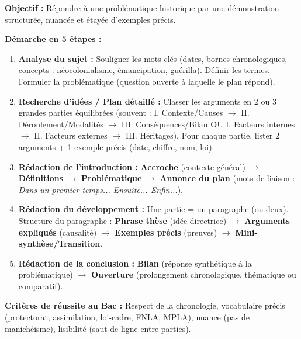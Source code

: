 \documentclass[11pt]{article}
\newcommand{\cle}[1]{{\popxbold\color{popdark}#1}}
\begin{document}
\begin{methode}
\textbf{Objectif :} Répondre à une problématique historique par une démonstration structurée, nuancée et étayée d'exemples précis.
\par \textbf{Démarche en 5 étapes :}
\begin{enumerate}
    \item \textbf{Analyse du sujet :} Souligner les mots-clés (dates, bornes chronologiques, concepts : \cle{néocolonialisme}, \cle{émancipation}, \cle{guérilla}). Définir les termes. Formuler la \cle{problématique} (question ouverte à laquelle le plan répond).
    \item \textbf{Recherche d'idées / Plan détaillé :} Classer les arguments en 2 ou 3 grandes parties équilibrées (souvent : I. Contexte/Causes $\to$ II. Déroulement/Modalités $\to$ III. Conséquences/Bilan OU I. Facteurs internes $\to$ II. Facteurs externes $\to$ III. Héritages). Pour chaque partie, lister 2 arguments + 1 exemple précis (date, chiffre, nom, loi).
    \item \textbf{Rédaction de l'introduction :} \textbf{Accroche} (contexte général) $\to$ \textbf{Définitions} $\to$ \textbf{Problématique} $\to$ \textbf{Annonce du plan} (mots de liaison : \emph{Dans un premier temps... Ensuite... Enfin...}).
    \item \textbf{Rédaction du développement :} Une partie = un paragraphe (ou deux). Structure du paragraphe : \textbf{Phrase thèse} (idée directrice) $\to$ \textbf{Arguments expliqués} (causalité) $\to$ \textbf{Exemples précis} (preuves) $\to$ \textbf{Mini-synthèse/Transition}.
    \item \textbf{Rédaction de la conclusion :} \textbf{Bilan} (réponse synthétique à la problématique) $\to$ \textbf{Ouverture} (prolongement chronologique, thématique ou comparatif).
\end{enumerate}
\par \textbf{Critères de réussite au Bac :} Respect de la chronologie, vocabulaire précis (\cle{protectorat}, \cle{assimilation}, \cle{loi-cadre}, \cle{FNLA}, \cle{MPLA}), nuance (pas de manichéisme), lisibilité (saut de ligne entre parties).
\end{methode}
\end{document}
